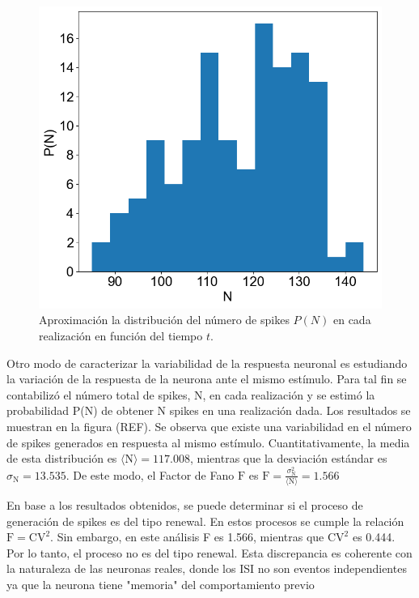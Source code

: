 \documentclass[aps,prb,twocolumn,superscriptaddress,floatfix,longbibliography]{revtex4-2}
\begin{document}
\begin{figure}[h]
  \includegraphics[clip=true,width=\columnwidth]{N_histogram.png}
  \caption{Aproximación la distribución del número de spikes $P(N)$ en cada realización en función del tiempo $t$.}
   \label{fig:N_histogram}
\end{figure}


Otro modo de caracterizar la variabilidad de la respuesta neuronal es estudiando la variación de la respuesta de la neurona ante el mismo estímulo. Para tal fin se contabilizó el número total de spikes, N, en cada realización y se estimó la probabilidad P(N) de obtener N spikes en una realización dada. Los resultados se muestran en la figura (REF). Se observa que existe una variabilidad en el número de spikes generados en respuesta al mismo estímulo. Cuantitativamente, la media de esta distribución es $\langle \mathrm{N} \rangle = 117.008$, mientras que la desviación estándar es $\sigma_{\mathrm{N}} = 13.535$. De este modo, el Factor de Fano $\mathrm{F}$ es $\mathrm{F} = \frac{\sigma_\mathrm{N}^2}{\langle \mathrm{N} \rangle} = 1.566$ 

En base a los resultados obtenidos, se puede determinar si el proceso de generación de spikes es del tipo renewal. En estos procesos se cumple la relación $\mathrm{F} = \mathrm{CV}^2$. Sin embargo, en este análisis F es 1.566, mientras que $\mathrm{CV}^2$ es 0.444. Por lo tanto, el proceso no es del tipo renewal. Esta discrepancia es coherente con la naturaleza de las neuronas reales, donde los ISI no son eventos independientes ya que la neurona tiene "memoria" del comportamiento previo
\end{document}
